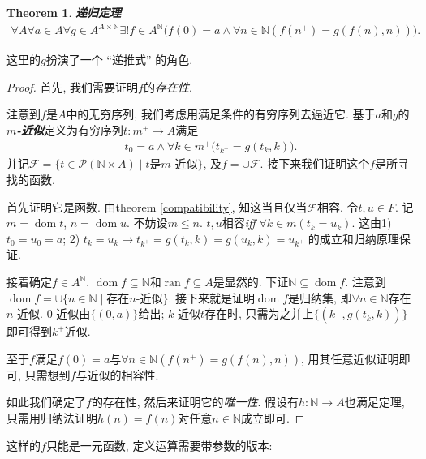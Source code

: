 \documentclass[UTF8,AutoFakeBold]{ctexart}
\theoremstyle{plain}
\newtheorem{theorem}{Theorem}[section] %
\theoremstyle{definition}
\newcommand*{\indexbf}[1]{\textit{\textbf{#1}}\index{#1}}
\DeclareMathOperator{\dom}{dom}
\DeclareMathOperator{\ran}{ran}
\begin{document}
\begin{theorem} \indexbf{递归定理}
\begin{align*}
	\forall A\forall a\in A\forall g \in A^{A\times \mathbb N}\exists ! f\in A^\mathbb N\big(
		f(0)=a \wedge \forall n\in \mathbb N(
			f(n^+) = g(f(n),n))\big).
\end{align*}
\end{theorem}
这里的$g$扮演了一个 ``递推式'' 的角色.
\begin{proof}
首先, 我们需要证明$f$的\emph{存在性}. 

注意到$f$是$A$中的无穷序列, 我们考虑用满足条件的有穷序列去逼近它.
基于$a$和$g$的\indexbf{$m$-近似}定义为有穷序列$t\colon m^+\to A$满足
\begin{align*}
	t_0 = a\wedge \forall k\in m^+\big(
		t_{k^+} = g(t_k,k)\big).
\end{align*}
并记$
\mathcal F = \{ t\in \mathscr P(\mathbb N\times A)\mid t\text{是$m$-近似}\}$, 及$
f = \cup \mathcal F$. 接下来我们证明这个$f$是所寻找的函数.

首先证明它是函数. 
由theorem \ref{compatibility}, 知这当且仅当$\mathcal F$相容. 
令$t,u\in F$. 记$m=\dom t$, $n=\dom u$. 不妨设$m\leq n$.
$t,u$相容\emph{iff} $\forall k\in m (t_k = u_k)$. 
这由1) $t_0=u_0=a$; 2) $t_k =u_k \to t_{k^+} = g( t_k,k) = g(u_k,k) = u_{k^+}$ 的成立和归纳原理保证.

接着确定$f \in A^\mathbb N$. $\dom f \subseteq \mathbb N $和$\ran f \subseteq A$是显然的.
下证$\mathbb N \subseteq \dom f$. 注意到$\dom f = \cup \{ n\in \mathbb N\mid \text{存在$n$-近似}\}$.
接下来就是证明$\dom f$是归纳集, 即$\forall n\in \mathbb N$存在$n$-近似. 
$0$-近似由$\{(0,a)\}$给出; $k$-近似$t$存在时, 只需为之并上$\{(k^+, g(t_k, k))\}$即可得到$k^+$近似.

至于$f$满足$f(0)=a$与$\forall n\in \mathbb N(f(n^+) = g(f(n),n))$, 用其任意近似证明即可, 只需想到$f$与近似的相容性.

如此我们确定了$f$的存在性, 然后来证明它的\emph{唯一性}. 
假设有$h: \mathbb N \to A$也满足定理, 只需用归纳法证明$h(n)=f(n)$对任意$n\in \mathbb N$成立即可. 
\end{proof}

这样的$f$只能是一元函数, 定义运算需要带参数的版本:
\end{document}

